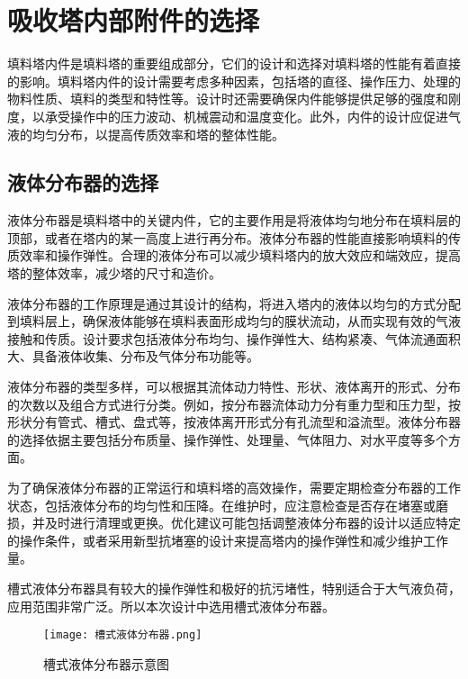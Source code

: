 \chapter{吸收塔内部附件的选择}
填料塔内件是填料塔的重要组成部分，它们的设计和选择对填料塔的性能有着直接的影响。填料塔内件的设计需要考虑多种因素，包括塔的直径、操作压力、处理的物料性质、填料的类型和特性等。设计时还需要确保内件能够提供足够的强度和刚度，以承受操作中的压力波动、机械震动和温度变化。此外，内件的设计应促进气液的均匀分布，以提高传质效率和塔的整体性能。



\section{液体分布器的选择}
液体分布器是填料塔中的关键内件，它的主要作用是将液体均匀地分布在填料层的顶部，或者在塔内的某一高度上进行再分布。液体分布器的性能直接影响填料的传质效率和操作弹性。合理的液体分布可以减少填料塔内的放大效应和端效应，提高塔的整体效率，减少塔的尺寸和造价。

液体分布器的工作原理是通过其设计的结构，将进入塔内的液体以均匀的方式分配到填料层上，确保液体能够在填料表面形成均匀的膜状流动，从而实现有效的气液接触和传质。设计要求包括液体分布均匀、操作弹性大、结构紧凑、气体流通面积大、具备液体收集、分布及气体分布功能等。

液体分布器的类型多样，可以根据其流体动力特性、形状、液体离开的形式、分布的次数以及组合方式进行分类。例如，按分布器流体动力分有重力型和压力型，按形状分有管式、槽式、盘式等，按液体离开形式分有孔流型和溢流型。液体分布器的选择依据主要包括分布质量、操作弹性、处理量、气体阻力、对水平度等多个方面。

为了确保液体分布器的正常运行和填料塔的高效操作，需要定期检查分布器的工作状态，包括液体分布的均匀性和压降。在维护时，应注意检查是否存在堵塞或磨损，并及时进行清理或更换。优化建议可能包括调整液体分布器的设计以适应特定的操作条件，或者采用新型抗堵塞的设计来提高塔内的操作弹性和减少维护工作量。

槽式液体分布器具有较大的操作弹性和极好的抗污堵性，特别适合于大气液负荷，应用范围非常广泛。所以本次设计中选用槽式液体分布器。

\clearpage

\begin{figure}
	\caption{槽式液体分布器示意图}
	\centering
	\texttt{[image: 槽式液体分布器.png]}
\end{figure}



